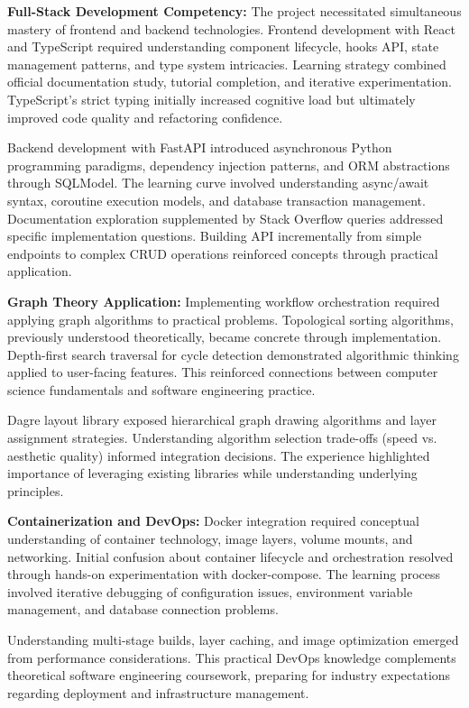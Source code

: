 \documentclass[12pt]{article}
\begin{document}
\textbf{Full-Stack Development Competency:} The project necessitated simultaneous mastery of frontend and backend technologies. Frontend development with React and TypeScript required understanding component lifecycle, hooks API, state management patterns, and type system intricacies. Learning strategy combined official documentation study, tutorial completion, and iterative experimentation. TypeScript's strict typing initially increased cognitive load but ultimately improved code quality and refactoring confidence.

Backend development with FastAPI introduced asynchronous Python programming paradigms, dependency injection patterns, and ORM abstractions through SQLModel. The learning curve involved understanding async/await syntax, coroutine execution models, and database transaction management. Documentation exploration supplemented by Stack Overflow queries addressed specific implementation questions. Building API incrementally from simple endpoints to complex CRUD operations reinforced concepts through practical application.

\textbf{Graph Theory Application:} Implementing workflow orchestration required applying graph algorithms to practical problems. Topological sorting algorithms, previously understood theoretically, became concrete through implementation. Depth-first search traversal for cycle detection demonstrated algorithmic thinking applied to user-facing features. This reinforced connections between computer science fundamentals and software engineering practice.

Dagre layout library exposed hierarchical graph drawing algorithms and layer assignment strategies. Understanding algorithm selection trade-offs (speed vs. aesthetic quality) informed integration decisions. The experience highlighted importance of leveraging existing libraries while understanding underlying principles.

\textbf{Containerization and DevOps:} Docker integration required conceptual understanding of container technology, image layers, volume mounts, and networking. Initial confusion about container lifecycle and orchestration resolved through hands-on experimentation with docker-compose. The learning process involved iterative debugging of configuration issues, environment variable management, and database connection problems.

Understanding multi-stage builds, layer caching, and image optimization emerged from performance considerations. This practical DevOps knowledge complements theoretical software engineering coursework, preparing for industry expectations regarding deployment and infrastructure management.
\end{document}
